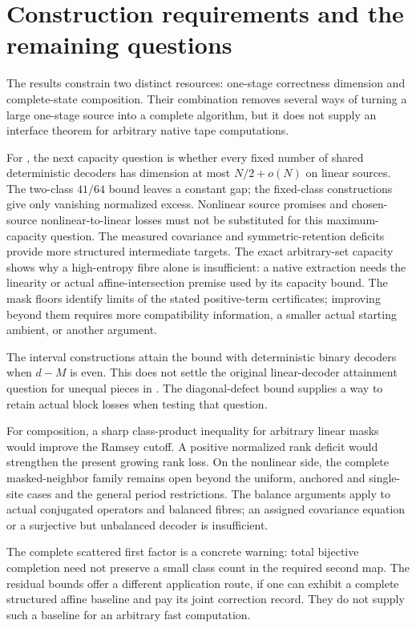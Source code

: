 \section{Construction requirements and the remaining questions}\label{sec:open}
The results constrain two distinct resources: one-stage correctness dimension
and complete-state composition. Their combination removes several ways of
turning a large one-stage source into a complete algorithm, but it does not
supply an interface theorem for arbitrary native tape computations.

For \cite[Problem~9.1(a)]{SeventeenthPaper2026}, the next capacity question is whether every fixed number of shared deterministic
decoders has dimension at most $N/2+o(N)$ on linear sources. The two-class
$41/64$ bound leaves a constant gap; the fixed-class constructions give only
vanishing normalized excess. Nonlinear source promises and chosen-source
nonlinear-to-linear losses must not be substituted for this maximum-capacity
question. The measured covariance and symmetric-retention deficits provide
more structured intermediate targets. The exact arbitrary-set capacity shows
why a high-entropy fibre alone is insufficient: a native extraction needs the
linearity or actual affine-intersection premise used by its capacity bound.
The mask floors identify limits of the stated positive-term certificates;
improving beyond them requires more compatibility information, a smaller
actual starting ambient, or another argument.

The interval constructions attain the bound with deterministic binary
decoders when $d-M$ is even. This does not settle the original linear-decoder
attainment question for unequal pieces in
\cite[Problem~9.2]{SeventeenthPaper2026}. The diagonal-defect bound supplies
a way to retain actual block losses when testing that question.

For composition, a sharp class-product inequality for arbitrary linear masks
would improve the Ramsey cutoff. A positive normalized rank deficit would
strengthen the present growing rank loss. On the nonlinear side, the complete
masked-neighbor family remains open beyond the uniform, anchored and single-site
cases and the general period restrictions. The balance arguments apply to
actual conjugated operators and balanced fibres; an assigned covariance equation
or a surjective but unbalanced decoder is insufficient.

The complete scattered first factor is a concrete warning: total bijective
completion need not preserve a small class count in the required second map.
The residual bounds offer a different application route, if one can exhibit
a complete structured affine baseline and pay its joint correction record.
They do not supply such a baseline for an arbitrary fast computation.

